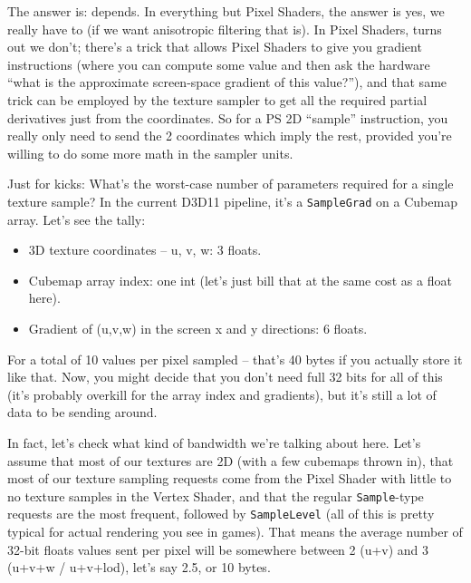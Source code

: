 \documentclass[12pt]{article}
\begin{document}
The answer is: depends. In everything but Pixel Shaders, the answer is yes, we really have to (if we want anisotropic filtering that is). In Pixel Shaders, turns out we don’t; there’s a trick that allows Pixel Shaders to give you gradient instructions (where you can compute some value and then ask the hardware “what is the approximate screen-space gradient of this value?”), and that same trick can be employed by the texture sampler to get all the required partial derivatives just from the coordinates. So for a PS 2D “sample” instruction, you really only need to send the 2 coordinates which imply the rest, provided you’re willing to do some more math in the sampler units.

Just for kicks: What’s the worst-case number of parameters required for a single texture sample? In the current D3D11 pipeline, it’s a \texttt{SampleGrad} on a Cubemap array. Let’s see the tally:

\begin{itemize}
\item 3D texture coordinates – u, v, w: 3 floats.
\item Cubemap array index: one int (let’s just bill that at the same cost as a float here).
\item Gradient of (u,v,w) in the screen x and y directions: 6 floats.
\end{itemize}

For a total of 10 values per pixel sampled – that’s 40 bytes if you actually store it like that. Now, you might decide that you don’t need full 32 bits for all of this (it’s probably overkill for the array index and gradients), but it’s still a lot of data to be sending around.

In fact, let’s check what kind of bandwidth we’re talking about here. Let’s assume that most of our textures are 2D (with a few cubemaps thrown in), that most of our texture sampling requests come from the Pixel Shader with little to no texture samples in the Vertex Shader, and that the regular \texttt{Sample}-type requests are the most frequent, followed by \texttt{SampleLevel} (all of this is pretty typical for actual rendering you see in games). That means the average number of 32-bit floats values sent per pixel will be somewhere between 2 (u+v) and 3 (u+v+w / u+v+lod), let’s say 2.5, or 10 bytes.
\end{document}
